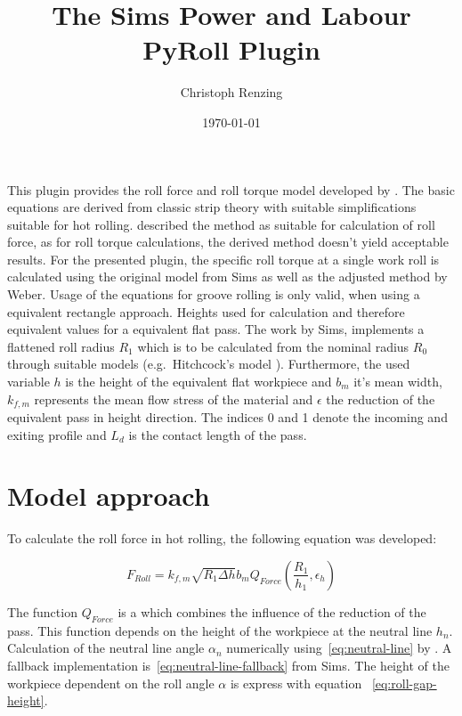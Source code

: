 \documentclass[11pt]{PyRollDocs}
\begin{document}
    \title{The Sims Power and Labour PyRoll Plugin}
    \author{Christoph Renzing}
    \date{\today}

    \maketitle

    This plugin provides the roll force and roll torque model developed by \textcite{Sims1954}.
    The basic equations are derived from classic strip theory with suitable simplifications suitable for hot rolling.
    \textcite{Weber1960, Weber1973} described the method as suitable for calculation of roll force, as for roll torque calculations, the derived method doesn't yield acceptable results.
    For the presented plugin, the specific roll torque at a single work roll is calculated using the original model from Sims as well as the adjusted method by Weber.
    Usage of the equations for groove rolling is only valid, when using a equivalent rectangle approach.
    Heights used for calculation and therefore equivalent values for a equivalent flat pass.
    The work by Sims, implements a flattened roll radius $R_1$ which is to be calculated from the nominal radius $R_0$ through suitable models (e.g.~Hitchcock's model \textcite{Hitchcook1935}).
    Furthermore, the used variable $h$ is the height of the equivalent flat workpiece and $b_m$ it's mean width, $k_{f,m}$ represents the mean flow stress of the material and $\epsilon$ the reduction of the equivalent pass in height direction.
    The indices 0 and 1 denote the incoming and exiting profile and $L_d$ is the contact length of the pass.


    \section{Model approach}\label{sec:model-approach}

    To calculate the roll force in hot rolling, the following equation was developed:

    \begin{equation}
        F_{Roll} = k_{f, m} \sqrt{R_1 \Delta h} b_m Q_{Force}(\frac{R_1}{h_1}, \epsilon_h)
        \label{eq:sims-force}
    \end{equation}

    The function $Q_{Force}$ is a which combines the influence of the reduction of the pass.
    This function depends on the height of the workpiece at the neutral line $h_{n}$.
    Calculation of the neutral line angle $\alpha_n$ numerically using~\eqref{eq:neutral-line} by \textcite{Sims1954}.
    A fallback implementation is~\eqref{eq:neutral-line-fallback} from Sims.
    The height of the workpiece dependent on the roll angle $\alpha$ is express with equation ~\ref{eq:roll-gap-height}.
\end{document}
